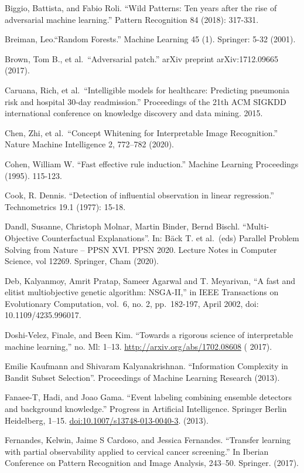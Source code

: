\documentclass[
  12pt,
]{krantz}
\begin{document}
Biggio, Battista, and Fabio Roli. ``Wild Patterns: Ten years after the rise of adversarial machine learning.'' Pattern Recognition 84 (2018): 317-331.

Breiman, Leo.``Random Forests.'' Machine Learning 45 (1). Springer: 5-32 (2001).

Brown, Tom B., et al.~``Adversarial patch.'' arXiv preprint arXiv:1712.09665 (2017).

Caruana, Rich, et al.~``Intelligible models for healthcare: Predicting pneumonia risk and hospital 30-day readmission.'' Proceedings of the 21th ACM SIGKDD international conference on knowledge discovery and data mining. 2015.

Chen, Zhi, et al.~``Concept Whitening for Interpretable Image Recognition.'' Nature Machine Intelligence 2, 772--782 (2020).

Cohen, William W. ``Fast effective rule induction.'' Machine Learning Proceedings (1995). 115-123.

Cook, R. Dennis. ``Detection of influential observation in linear regression.'' Technometrics 19.1 (1977): 15-18.

Dandl, Susanne, Christoph Molnar, Martin Binder, Bernd Bischl. ``Multi-Objective Counterfactual Explanations''. In: Bäck T. et al.~(eds) Parallel Problem Solving from Nature -- PPSN XVI. PPSN 2020. Lecture Notes in Computer Science, vol 12269. Springer, Cham (2020).

Deb, Kalyanmoy, Amrit Pratap, Sameer Agarwal and T. Meyarivan, ``A fast and elitist multiobjective genetic algorithm: NSGA-II,'' in IEEE Transactions on Evolutionary Computation, vol.~6, no. 2, pp.~182-197, April 2002, doi: 10.1109/4235.996017.

Doshi-Velez, Finale, and Been Kim. ``Towards a rigorous science of interpretable machine learning,'' no. Ml: 1--13. \url{http://arxiv.org/abs/1702.08608} ( 2017).

Emilie Kaufmann and Shivaram Kalyanakrishnan. ``Information Complexity in Bandit Subset Selection''. Proceedings of Machine Learning Research (2013).

Fanaee-T, Hadi, and Joao Gama. ``Event labeling combining ensemble detectors and background knowledge.'' Progress in Artificial Intelligence. Springer Berlin Heidelberg, 1--15. \url{doi:10.1007/s13748-013-0040-3}. (2013).

Fernandes, Kelwin, Jaime S Cardoso, and Jessica Fernandes. ``Transfer learning with partial observability applied to cervical cancer screening.'' In Iberian Conference on Pattern Recognition and Image Analysis, 243--50. Springer. (2017).
\end{document}
